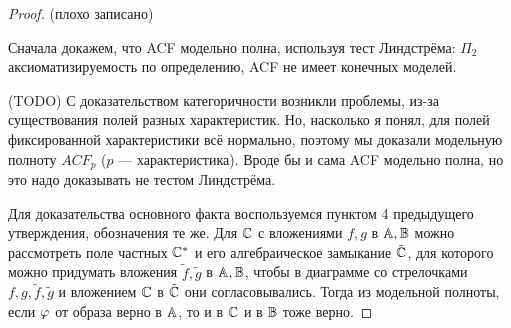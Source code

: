 \begin{proof}(плохо записано)\

    Сначала докажем, что ACF модельно полна, используя тест Линдстрёма: $\Pi_2$ аксиоматизируемость по определению, ACF не имеет конечных моделей. 

    (TODO) С доказательством категоричности возникли проблемы, из-за существования полей разных характеристик. Но, насколько я понял, для полей фиксированной характеристики всё нормально, поэтому мы доказали модельную полноту $ACF_p$ ($p$ — характеристика). Вроде бы и сама ACF модельно полна, но это надо доказывать не тестом Линдстрёма.

    Для доказательства основного факта воспользуемся пунктом 4 предыдущего утверждения, обозначения те же. Для ${\mathbb C}$ с вложениями $f, g$  в ${\mathbb A}, {\mathbb B}$ можно рассмотреть поле частных ${\mathbb C}^*$ и его алгебраическое замыкание $\tilde{{\mathbb C}}$, для которого можно придумать вложения $\tilde{f}, \tilde{g}$ в ${\mathbb A}, {\mathbb B}$, чтобы в диаграмме со стрелочками $f, g, \tilde{f}, \tilde{g}$ и вложением ${\mathbb C}$ в $\tilde{{\mathbb C}}$ они согласовывались. Тогда из модельной полноты, если $\varphi$ от образа верно в ${\mathbb A}$, то и в ${\mathbb C}$ и в ${\mathbb B}$ тоже верно.
\end{proof}
